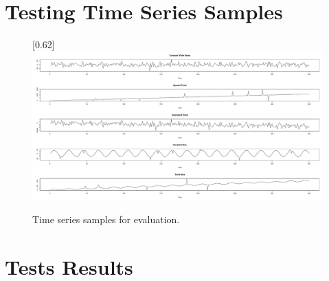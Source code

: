 \chapter{Testing Time Series Samples} \label{appen:testing-samples}
    \begin{figure}[H]
        \begin{center}
            \scalebox{0.22}[0.62]{\includegraphics[angle=0]{img/testing-time-series.pdf}}
            \caption{Time series samples for evaluation.}
            \label{appen:img-testing-samples}
        \end{center}
    \end{figure}

\chapter{Tests Results} \label{appen:chap:results}

